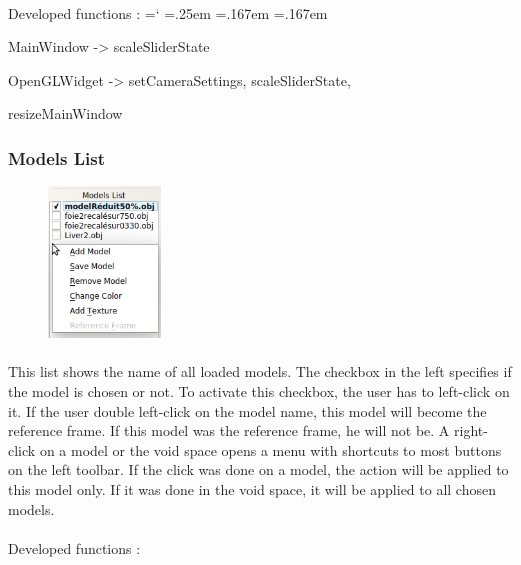 \documentclass[12pt]{report}
\DeclareRobustCommand*{\ttfamily}{
  \origttfamily
  \hyphenchar\font=`\-\relax
  \fontdimen3\font=.25em\relax
  \fontdimen4\font=.167em\relax
  \fontdimen7\font=.167em\relax
}
\newenvironment{code}{\ttfamily}{}
\begin{document}
\paragraph{}
	Developed functions :
	\begin{code}
	
	MainWindow -> scaleSliderState

	OpenGLWidget -> setCameraSettings, scaleSliderState,
	
	resizeMainWindow
	\end{code}



\vspace{10pt}
\subsubsection{Models List} \label{subsubsec:models list}

\begin{figure}
\vspace{-15pt}
\includegraphics[width=3cm]{img/modelsList.png}
\end{figure}
\paragraph{}
	This list shows the name of all loaded models. The checkbox in the left specifies if the model is chosen or not. To activate this checkbox, the user has to left-click on it. If the user double left-click on the model name, this model will become the reference frame. If this model was the reference frame, he will not be. A right-click on a model or the void space opens a menu with shortcuts to most buttons on the left toolbar. If the click was done on a model, the action will be applied to this model only. If it was done in the void space, it will be applied to all chosen models.

\paragraph{}
	Developed functions :
\end{document}
